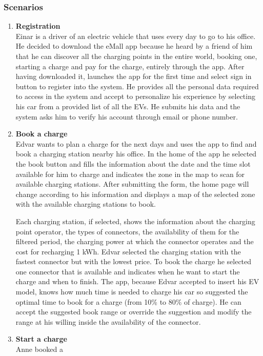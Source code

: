 \subsubsection{Scenarios}
\begin{enumerate}[label=\textbf{\Alph*}.]
      \item \textbf{Registration} \\
            Einar is a driver of an electric vehicle that uses every day to go to his
            office. He decided to download the eMall app because he heard by a friend
            of him that he can discover all the charging points in the entire world,
            booking one, starting a charge and pay for the charge, entirely through
            the app. After having downloaded it, launches the app for the first time
            and select sign in button to register into the system. He provides all
            the personal data required to access in the system and accept to personalize
            his experience by selecting his car from a provided list of all the EVs.
            He submits his data and the system asks him to verify his account through email or phone number.
      \item \textbf{Book a charge} \\
            Edvar wants to plan a charge for the next days and uses the app to find and book a charging
            station nearby his office. In the home of the app he selected the book button and fills the
            information about the date and the time slot available for him to charge and indicates the
            zone in the map to scan for available charging stations. After submitting the form, the home page
            will change according to his information and displays a map of the selected zone with the available
            charging stations to book.

            Each charging station, if selected, shows the information about the charging point operator,
            the types of connectors, the availability of them for the filtered period,
            the charging power at which the connector operates and the cost for recharging 1 kWh.
            Edvar selected the charging station with the fastest connector but with the lowest price.
            To book the charge he selected one connector that is available and indicates when he want to start the charge
            and when to finish.
            The app, because Edvar accepted to insert his EV model, knows how much time is needed to charge his car so suggested
            the optimal time to book for a charge (from 10\% to 80\% of charge).
            He can accept the suggested book range or override the suggestion and modify the range at his willing inside the
            availability of the connector.
      \item \textbf{Start a charge} \\
            Anne booked a 
\end{enumerate}

